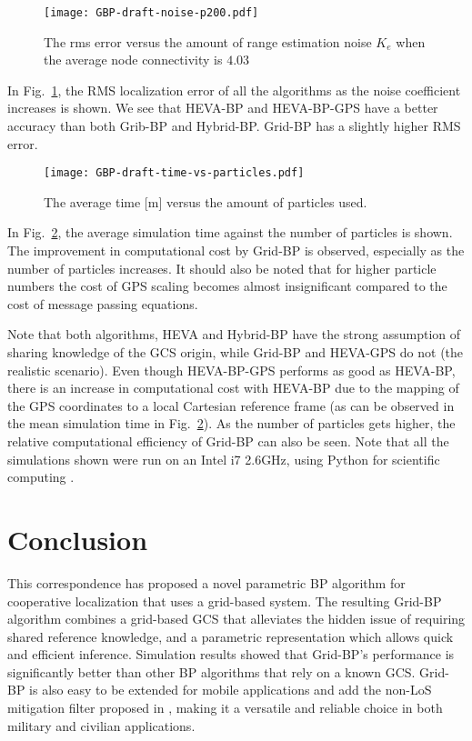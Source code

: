 \documentclass[10pt, final, journal]{IEEEtran}
\begin{document}
\begin{figure}[!ht]
  \centering
  \texttt{[image: GBP-draft-noise-p200.pdf]}
  \caption{The rms error versus the amount of range estimation noise $K_{e}$ when the average node connectivity is $4.03$}\label{fig:noise}
\end{figure}

In Fig.~\ref{fig:noise}, the RMS localization error of all the algorithms as the noise coefficient increases is shown. We see that HEVA-BP and HEVA-BP-GPS have a better accuracy than both Grib-BP and Hybrid-BP. Grid-BP has a slightly higher RMS error.

\begin{figure}[!ht]
  \centering
\texttt{[image: GBP-draft-time-vs-particles.pdf]}
\caption{The average time [m] versus the amount of particles used.}\label{fig:time}
\end{figure}

In Fig.~\ref{fig:time}, the average simulation time against the number of particles is shown. The improvement in computational cost by Grid-BP is observed, especially as the number of particles increases. It should also be noted that for higher particle numbers the cost of GPS scaling becomes almost insignificant compared to the cost of message passing equations.

Note that both algorithms, HEVA and Hybrid-BP have the strong assumption of sharing knowledge of the GCS origin, while Grid-BP and HEVA-GPS do not (the realistic scenario). Even though HEVA-BP-GPS performs as good as HEVA-BP, there is an increase in computational cost with HEVA-BP due to the mapping of the GPS coordinates to a local Cartesian reference frame (as can be observed in the mean simulation time in Fig.~\ref{fig:time}). As the number of particles gets higher, the relative computational efficiency of Grid-BP can also be seen. Note that all the simulations shown were run on an Intel i7 2.6GHz, using Python for scientific computing \cite{Oliphant:2007dm}.
\section{Conclusion}
This correspondence has proposed a novel parametric BP algorithm for cooperative localization that uses a grid-based system. The resulting Grid-BP algorithm combines a grid-based GCS that alleviates the hidden issue of requiring shared reference knowledge, and a parametric representation which allows quick and efficient inference. Simulation results showed that Grid-BP's performance is significantly better than other BP algorithms that rely on a known GCS. Grid-BP is also easy to be extended for mobile applications and add the non-LoS mitigation filter proposed in \cite{oikonomou2011hybrid}, making it a versatile and reliable choice in both military and civilian applications.
\end{document}
